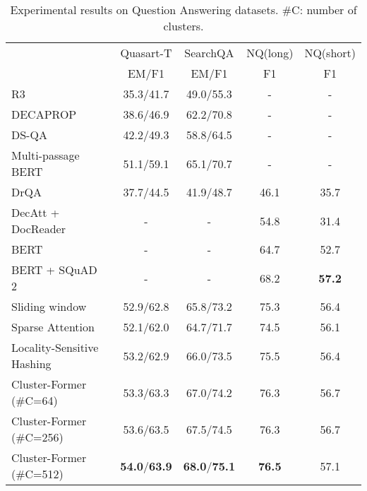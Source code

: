 \documentclass[11pt,a4paper]{article}
\begin{document}
\begin{table*}[t]
\centering
\begin{tabular}{lcccc}
\toprule
                           & Quasart-T & SearchQA  & NQ(long) & NQ(short) \\
                           & EM/F1     & EM/F1     & F1       & F1        \\
\midrule                
R3~\cite{wang2018r}                         & 35.3/41.7 & 49.0/55.3 & -        & -         \\
DECAPROP~\cite{tay2018densely} &38.6/46.9 & 62.2/70.8 &- &-\\
DS-QA~\cite{lin2018denoising}                      & 42.2/49.3 & 58.8/64.5 & -        & -         \\
Multi-passage BERT~\cite{wang2019multi}         & 51.1/59.1 & 65.1/70.7 & -        & -         \\
DrQA~\cite{chen2017reading}                       & 37.7/44.5 & 41.9/48.7 & 46.1     & 35.7      \\
DecAtt + DocReader~\cite{kwiatkowski2019natural}         & -         & -         & 54.8     & 31.4      \\
BERT~\cite{alberti2019bert}                  & -         & -         & 64.7     & 52.7      \\
BERT + SQuAD 2~\cite{pan2019frustratingly} & -         & -         & 68.2    & \textbf{57.2}       \\
\midrule
Sliding window   & 52.9/62.8 & 65.8/73.2 & 75.3     & 56.4\\
Sparse Attention~\cite{sparsetransf}               & 52.1/62.0 & 64.7/71.7 & 74.5     & 56.1\\
Locality-Sensitive Hashing~\cite{reformer}       & 53.2/62.9 & 66.0/73.5 & 75.5     & 56.4\\
\midrule
Cluster-Former (\#C=64)        & 53.3/63.3 & 67.0/74.2 & 76.3     & 56.7\\
Cluster-Former (\#C=256)       & 53.6/63.5 & 67.5/74.5 & 76.3     & 56.7\\
Cluster-Former (\#C=512)       & \textbf{54.0}/\textbf{63.9} & \textbf{68.0}/\textbf{75.1} & \textbf{76.5}     & 57.1\\
\bottomrule
\end{tabular}
\caption{Experimental results on Question Answering datasets. \#C: number of clusters.}
\label{tbl:qa}
\end{table*}
\end{document}

